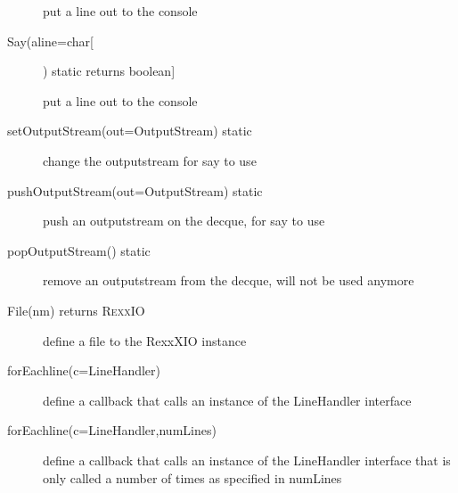 \begin{description}
put a line out to the console
  \item[Say(aline=char[]) static returns boolean]

put a line out to the console
  \item[setOutputStream(out=OutputStream) static]

change the outputstream for say to use  
 
\item[pushOutputStream(out=OutputStream) static]


push an outputstream on the decque, for say to use
  \item[popOutputStream() static]

remove an outputstream from the decque, will not be used anymore
  \item[File(nm) returns R\textsc{exx}IO]

define a file to the RexxXIO instance
  \item[forEachline(c=LineHandler)]

define a callback that calls an instance of the LineHandler interface
  \item[forEachline(c=LineHandler,numLines)]

define a callback that calls an instance of the LineHandler interface that is only called a number of times as specified in numLines
\end{description}


